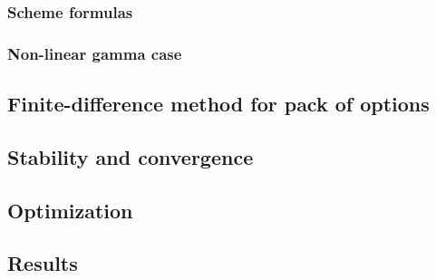 \documentclass[11pt]{article} %
\begin{document}
\subsubsection{Scheme formulas}

\subsubsection{Non-linear gamma case}

\subsection{Finite-difference method for pack of options}

\subsection{Stability and convergence}

\subsection{Optimization}



\subsection{Results}


\end{document}
